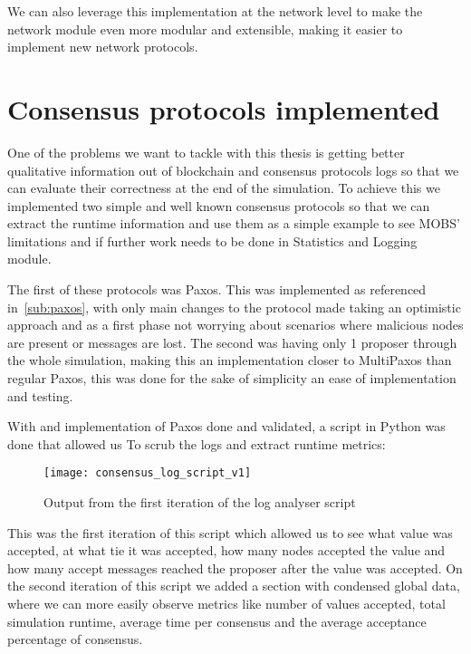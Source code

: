 We can also leverage this implementation at the network level to make the network
module even more modular and extensible, making it easier to implement new network protocols.

\section{Consensus protocols implemented}\label{sub:consensus_protocols_implemented}

One of the problems we want to tackle with this thesis is getting better qualitative information out of
blockchain and consensus protocols logs so that we can evaluate their correctness at the end 
of the simulation. To achieve this we implemented two simple and well known consensus protocols
so that we can extract the runtime information and use them as a simple example to see MOBS' limitations
and if further work needs to be done in Statistics and Logging module.

The first of these protocols was Paxos. This was implemented as referenced in~\ref{sub:paxos},
with only main changes to the protocol made taking an optimistic approach and as a first phase
not worrying about scenarios where malicious nodes are present or messages are lost. The second was
having only 1 proposer through the whole simulation, making this an implementation closer to MultiPaxos
than regular Paxos, this was done for the sake of simplicity an ease of implementation and testing.

With and implementation of Paxos done and validated, a script in Python was done that allowed us To
scrub the logs and extract runtime metrics:

\begin{figure}[h]
	\centering
	\texttt{[image: consensus\_log\_script\_v1]}
	\caption{Output from the first iteration of the log analyser script}
	\label{fig:consensus_log_script_v1}
\end{figure}

This was the first iteration of this script which allowed us to see what value was accepted,
at what tie it was accepted, how many nodes accepted the value and how many accept messages
reached the proposer after the value was accepted. 
On the second iteration of this script we added a section with condensed global data, where we can more
easily observe metrics like number of values accepted, total simulation runtime, average time per consensus
and the average acceptance percentage of consensus. 


